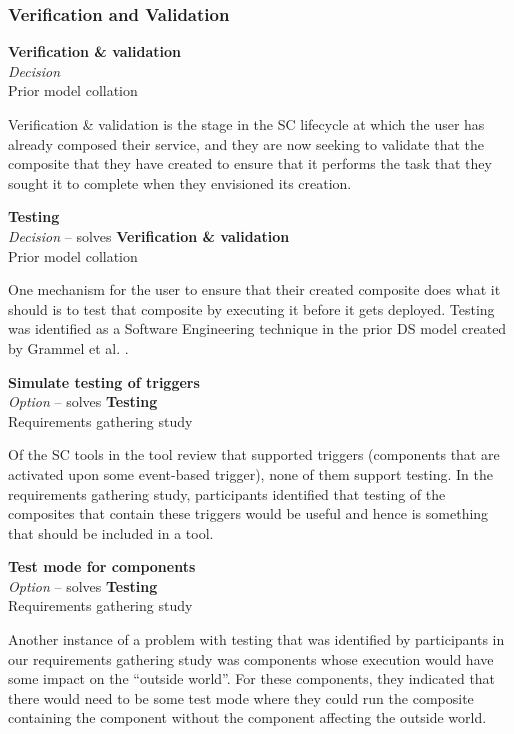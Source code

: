 \subsubsection{Verification and Validation}

\textbf{Verification \& validation} \\ \emph{Decision} \\ Prior model collation \cite{Mehandjiev2012}

Verification \& validation is the stage in the SC lifecycle at which the user has already composed their service, and they are now seeking to validate that the composite that they have created to ensure that it performs the task that they sought it to complete when they envisioned its creation.

\textbf{Testing} \\ \emph{Decision} -- solves \textbf{Verification \& validation} \\ Prior model collation \cite{Grammel2010}

One mechanism for the user to ensure that their created composite does what it should is to test that composite by executing it before it gets deployed. Testing was identified as a Software Engineering technique in the prior DS model created by Grammel et al. \cite{Grammel2010}.

\textbf{Simulate testing of triggers} \\ \emph{Option} -- solves \textbf{Testing} \\ Requirements gathering study

Of the SC tools in the tool review that supported triggers (components that are activated upon some event-based trigger), none of them support testing. In the requirements gathering study, participants identified that testing of the composites that contain these triggers would be useful and hence is something that should be included in a tool.

\textbf{Test mode for components} \\ \emph{Option} -- solves \textbf{Testing} \\ Requirements gathering study

Another instance of a problem with testing that was identified by participants in our requirements gathering study was components whose execution would have some impact on the ``outside world''. For these components, they indicated that there would need to be some test mode where they could run the composite containing the component without the component affecting the outside world.

